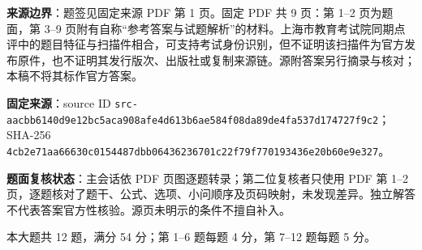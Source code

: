 

\begin{gktip}
\textbf{来源边界}：题签见固定来源 PDF 第 1 页。固定 PDF 共 9 页：第 1–2 页为题面，第 3–9 页附有自称“参考答案与试题解析”的材料。上海市教育考试院同期点评中的题目特征与扫描件相合，可支持考试身份识别，但不证明该扫描件为官方发布原件，也不证明其发行版次、出版社或复制来源链。源附答案另行摘录与核对；本稿不将其标作官方答案。

\textbf{固定来源}：source ID \texttt{src-aacbb6140d9e12bc5aca908afe4d613b6ae584f08da89de4fa537d174727f9c2}；SHA-256 \texttt{4cb2e71aa66630c0154487dbb06436236701c22f79f770193436e20b60e9e327}。

\textbf{题面复核状态}：主会话依 PDF 页图逐题转录；第二位复核者只使用 PDF 第 1–2 页，逐题核对了题干、公式、选项、小问顺序及页码映射，未发现差异。独立解答不代表答案官方性核验。源页未明示的条件不擅自补入。
\end{gktip}


\begin{gktip}
本大题共 12 题，满分 54 分；第 1–6 题每题 4 分，第 7–12 题每题 5 分。
\end{gktip}

